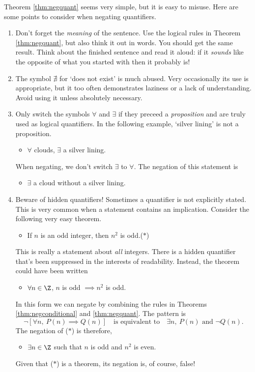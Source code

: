 Theorem \ref{thm:negquant} seems very simple, but it is easy to misuse. Here are some points to consider when negating quantifiers.

\begin{enumerate}
  \item Don't forget the \emph{meaning} of the sentence. Use the logical rules in Theorem \ref{thm:negquant}, but also think it out in words. You should get the same result. Think about the finished sentence and read it aloud: if it \emph{sounds} like the opposite of what you started with then it probably is!
  \item The symbol $\nexists$ for `does not exist' is much abused. Very occasionally its use is appropriate, but it too often demonstrates laziness or a lack of understanding. Avoid using it unless absolutely necessary.
  \item Only switch the symbols $\forall$ and $\exists$ if they preceed a \emph{proposition} and are truly used as logical quantifiers. In the following example, `silver lining' is not a proposition.
  \begin{itemize}\setlength{\itemsep}{0pt}
    \item[] $\forall$ clouds, $\exists$ a silver lining.
  \end{itemize}
	When negating, we don't switch $\exists$ to $\forall$. The negation of this statement is
	\begin{itemize}\setlength{\itemsep}{0pt}
    \item[] $\exists$ a cloud without a silver lining.
  \end{itemize}
	\item Beware of hidden quantifiers! Sometimes a quantifier is not explicitly stated. This is very common when a statement contains an implication. Consider the following very easy theorem.
	\begin{itemize}\setlength{\itemsep}{0pt}
    \item[] If $n$ is an odd integer, then $n^2$ is odd.\hfill($\ast$)
  \end{itemize}
  This is really a statement about \emph{all} integers. There is a hidden quantifier that's been suppressed in the interests of readability. Instead, the theorem could have been written
 	\begin{itemize}\setlength{\itemsep}{0pt}
    \item[] $\forall n\in\Z$, $n$ is odd $\implies n^2$ is odd.
  \end{itemize}
  In this form we can negate by combining the rules in Theorems \ref{thm:negconditional} and \ref{thm:negquant}. The pattern is
  \[\neg\left[\forall n,\ P(n)\implies Q(n)\right]\quad\text{is equivalent to}\quad \exists n,\ P(n)\text{ and }\neg Q(n).\]
 	The negation of ($\ast$) is therefore,
 	\begin{itemize}\setlength{\itemsep}{0pt}
    \item[] $\exists n\in\Z$ such that $n$ is odd and $n^2$ is even.
  \end{itemize}
  Given that ($\ast$) is a theorem, its negation is, of course, false!
\end{enumerate}

